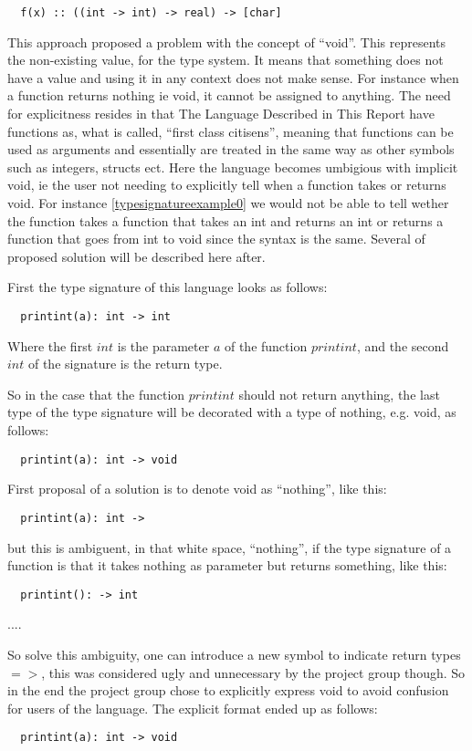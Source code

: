 \begin{verbatim}
  f(x) :: ((int -> int) -> real) -> [char]
\end{verbatim}
\label{typesignatureexample1}

This approach proposed a problem with the concept of \enquote{void}. This represents the non-existing value, for the type system. It means that something does not have a value and using it in any context does not make sense. For instance when a function returns nothing ie void, it cannot be assigned to anything. The need for explicitness resides in that The Language Described in This Report have functions as, what is called, \enquote{first class citisens}, meaning that functions can be used as arguments and essentially are treated in the same way as other symbols such as integers, structs ect. Here the language becomes umbigious with implicit void, ie the user not needing to explicitly tell when a function takes or returns void. For instance \cref{typesignatureexample0} we would not be able to tell wether the function takes a function that takes an int and returns an int or returns a function that goes from int to void since the syntax is the same.
Several of proposed solution will be described here after.

First the type signature of this language looks as follows:
\begin{verbatim}
  printint(a): int -> int
\end{verbatim}
Where the first $int$ is the parameter $a$ of the function $printint$, and the second $int$ of the signature is the return type.

So in the case that the function $printint$ should not return anything, the last type of the type signature will be decorated with a type of nothing, e.g. void, as follows:
\begin{verbatim}
  printint(a): int -> void
\end{verbatim}

First proposal of a solution is to denote void as \enquote{nothing}, like this:
\begin{verbatim}
  printint(a): int ->
\end{verbatim}
but this is ambiguent, in that white space, \enquote{nothing}, if the type signature of a function is that it takes nothing as parameter but returns something, like this:
\begin{verbatim}
  printint(): -> int
\end{verbatim}
.... %


So solve this ambiguity, one can introduce a new symbol to indicate return types $=>$, this was considered ugly and unnecessary by the project group though. So in the end the project group chose to explicitly express void to avoid confusion for users of the language. The explicit format ended up as follows:
\begin{verbatim}
  printint(a): int -> void
\end{verbatim}


